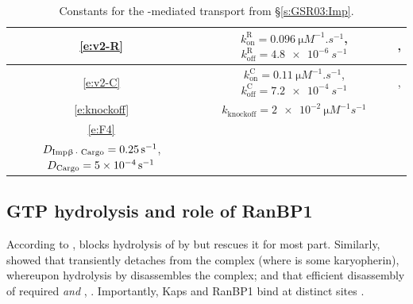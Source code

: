\documentclass[12pt,notitlepage]{article}
\begin{document}
\begin{table}
\centering
\small
\begin{tabular}{c|c|c}
	\hline
	\eqref{e:v2-R}
	&
	$k_\text{on}^\text{R} = \SI{0.096}{\micro M^{-1} . s^{-1}}$,
	\;
	$k_\text{off}^\text{R} = \SI{4.8e-6}{s^{-1}}$
	&
	\footnotesize
	\cite[Supp.~Table~A]{GoerlichSeewaldRibbeck2003},
	\cite[Table II]{RiddickMacara2005}
	\\
	\hline
	\eqref{e:v2-C}
	&
	$k_\text{on}^\text{C} = \SI{0.11}{\micro M^{-1} . s^{-1}}$,
	\quad
	$k_\text{off}^\text{C} = \SI{7.2e-4}{s^{-1}}$
	&
	\cite[Table~I]{Catimel2001},
	\cite[Table~II]{RiddickMacara2005}
	\\
	\hline
	\eqref{e:knockoff}
	&
	$k_\text{knockoff} = \SI{2e-2}{\micro M^{-1} s^{-1}}$
	&
	\cite[Table II]{RiddickMacara2005}
	\\
	\hline
	\eqref{e:F4}
	&
	\makecell{
		$D_{\ce{Imp\beta . Ran . GTP}} = \SI{0.07}{s^{-1}}$, \quad
		$D_{\ce{Imp\beta}} = \SI{0.4}{s^{-1}}$
		\\
		$D_{\ce{Imp\beta . Cargo}} = \SI{0.25}{s^{-1}}$, \;	
		$D_{\ce{Cargo}} = \SI{5e-4}{s^{-1}}$
	}
	&
	\cite[Table III]{RiddickMacara2005}
	\\
	\hline
\end{tabular}
%
\caption{%
	Constants for the -mediated
	transport from \S\ref{s:GSR03:Imp}.
}
%
\label{t:GSR-ImpB-const}
\end{table}







\subsection{GTP hydrolysis and role of RanBP1} \label{ss:ranbp1}

According to 
\cite[\href{https://i.ibb.co/6ghqPB7/image.jpg}{Fig.~4A}]{LounsburyMacara1997},
 blocks hydrolysis of  by 
but 
 rescues it for most part.
%
Similarly,
\cite{BischoffGoerlich1997}
showed that
 transiently detaches  
from the complex 
(where  is some karyopherin),
whereupon hydrolysis by  
disassembles the complex;
and
that efficient disassembly 
of  required  \emph{and} 
\cite[\S3.2, cf.~\href{https://i.ibb.co/PZKRSJ0/image.jpg}{Fig.~4}]{BischoffGoerlich1997},
\cite{FloerBlobelRexach1997}.
%
%
Importantly,
Kaps and RanBP1
bind 
at distinct sites
\cite[p.253]{BischoffGoerlich1997}.
\end{document}
